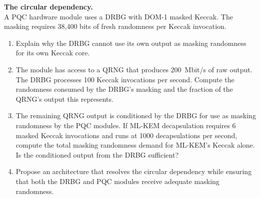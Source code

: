 \begin{prob}
\label{prob:ch13-circular}
\textbf{The circular dependency.}\\
A PQC hardware module uses a DRBG with DOM-1 masked Keccak.  The masking requires 38,400 bits of fresh randomness per Keccak invocation.
\begin{enumerate}
\item[(a)] Explain why the DRBG cannot use its own output as masking randomness for its own Keccak core.
\item[(b)] The module has access to a QRNG that produces 200~Mbit/s of raw output.  The DRBG processes 100 Keccak invocations per second.  Compute the randomness consumed by the DRBG's masking and the fraction of the QRNG's output this represents.
\item[(c)] The remaining QRNG output is conditioned by the DRBG for use as masking randomness by the PQC modules.  If ML-KEM decapsulation requires 6 masked Keccak invocations and runs at 1000 decapsulations per second, compute the total masking randomness demand for ML-KEM's Keccak alone.  Is the conditioned output from the DRBG sufficient?
\item[(d)] Propose an architecture that resolves the circular dependency while ensuring that both the DRBG and PQC modules receive adequate masking randomness.
\end{enumerate}
\end{prob}
